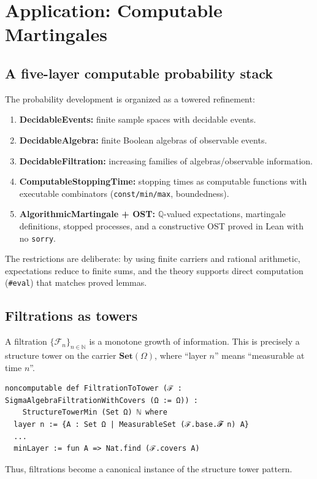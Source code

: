 \documentclass[11pt]{article}
\newcommand{\Set}{\mathbf{Set}}
\newcommand{\NN}{\mathbb{N}}
\newcommand{\QQ}{\mathbb{Q}}
\begin{document}
\section{Application: Computable Martingales}
\subsection{A five-layer computable probability stack}
The probability development is organized as a towered refinement:
\begin{enumerate}[leftmargin=1.2em]
\item \textbf{DecidableEvents:} finite sample spaces with decidable events.
\item \textbf{DecidableAlgebra:} finite Boolean algebras of observable events.
\item \textbf{DecidableFiltration:} increasing families of algebras/observable information.
\item \textbf{ComputableStoppingTime:} stopping times as computable functions with executable combinators (\texttt{const/min/max}, boundedness).
\item \textbf{AlgorithmicMartingale + OST:} $\QQ$-valued expectations, martingale definitions, stopped processes, and a constructive OST proved in Lean with no \texttt{sorry}.
\end{enumerate}

The restrictions are deliberate: by using finite carriers and rational arithmetic, expectations reduce to finite sums, and the theory supports direct computation (\texttt{\#eval}) that matches proved lemmas.

\subsection{Filtrations as towers}
A filtration $\{\mathcal{F}_n\}_{n\in\NN}$ is a monotone growth of information. This is precisely a structure tower on the carrier $\Set(\Omega)$, where ``layer $n$'' means ``measurable at time $n$''.

\begin{lstlisting}
noncomputable def FiltrationToTower (ℱ : SigmaAlgebraFiltrationWithCovers (Ω := Ω)) :
    StructureTowerMin (Set Ω) ℕ where
  layer n := {A : Set Ω | MeasurableSet (ℱ.base.𝓕 n) A}
  ...
  minLayer := fun A => Nat.find (ℱ.covers A)
\end{lstlisting}

Thus, filtrations become a canonical instance of the structure tower pattern.
\end{document}
